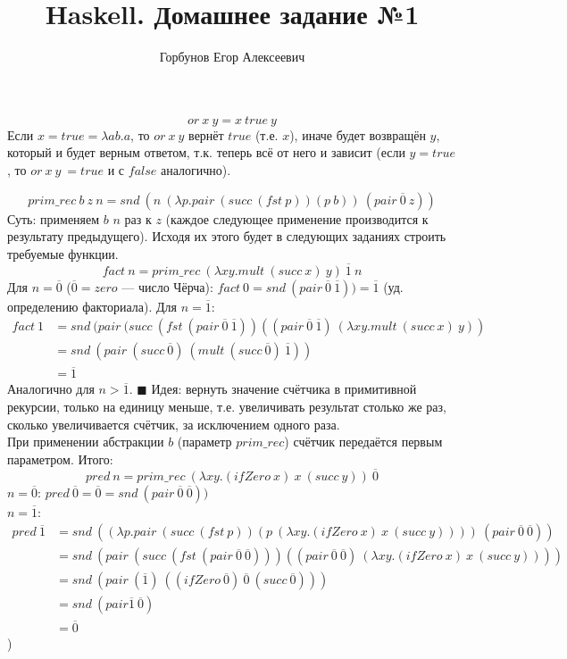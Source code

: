 

\title{Haskell. Домашнее задание №1}
\author{Горбунов Егор Алексеевич}


\maketitle

\[or\ x\ y = x\ true\ y\]
Если $x = true = \lambda ab.a$, то $or\ x\ y$ вернёт $true$ (т.е. $x$), иначе будет возвращён $y$, который и будет 
верным ответом, т.к. теперь всё от него и зависит (если $y = true$, то $or\ x\ y\ = true$ и с $false$ аналогично).

\[
prim\_rec\ b\ z\ n = snd\ (n\ (\lambda p.pair\ (succ\ (fst\ p))(p\ b))\ (pair\ \overline{0}\ z))
\]
Суть: применяем $b$ $n$ раз к $z$ (каждое следующее применение производится к результату предыдущего). Исходя их этого будет в следующих 
заданиях строить требуемые функции.
\[
fact\ n = prim\_rec\ (\lambda xy.mult\ (succ\ x)\ y)\ \overline{1}\ n
\]
Для $n = \overline{0}$ ($\overline{0}=zero$ --- число Чёрча): $fact\ 0 = snd\ (pair\ \overline{0}\ \overline{1})) = \overline{1}$ (уд. определению факториала).
Для $n = \overline{1}$: 
\begin{equation*}
\begin{split}
fact\ 1 &= snd\ (pair\ (succ\ (fst\ (pair\ \overline{0}\ \overline{1}))((pair\ \overline{0}\ \overline{1})\ (\lambda xy.mult\ (succ\ x)\ y)) \\
        &= snd\ (pair\ (succ\ \overline{0})\ (mult\ (succ\ \overline{0})\ \overline{1})) \\
        &= \overline{1}
\end{split}
\end{equation*}
Аналогично для $n > \overline{1}$. \hfill $\blacksquare$
Идея: вернуть значение счётчика в примитивной рекурсии, только на единицу меньше, т.е. увеличивать результат столько же раз, сколько увеличивается счётчик,
за исключением одного раза.\\
При применении абстракции $b$ (параметр $prim\_rec$) счётчик передаётся первым параметром. Итого:
\[
pred\ n = prim\_rec\ (\lambda xy.(ifZero\ x)\ x\ (succ\ y))\ \overline{0} 
\]
$n=\overline{0}$: $pred\ \overline{0} = \overline{0} = snd\ (pair\ \overline{0}\ \overline{0}))$\\
$n=\overline{1}$: 
\begin{equation*}
\begin{split}
pred\ \overline{1} &= snd\ ((\lambda p.pair\ (succ\ (fst\ p))(p\ (\lambda xy.(ifZero\ x)\ x\ (succ\ y))))\ (pair\ \overline{0}\ \overline{0}))\\
			       &= snd\ (pair\ (succ\ (fst\ (pair\ \overline{0}\ \overline{0})))((pair\ \overline{0}\ \overline{0})\ (\lambda xy.(ifZero\ x)\ x\ (succ\ y))))\\
			       &= snd\ (pair\ (\overline{1})\ ((ifZero\ \overline{0})\ \overline{0}\ (succ\ \overline{0}))) \\
			       &= snd\ (pair \overline{1}\ \overline{0}) \\
			       &= \overline{0}
\end{split}
\end{equation*}) 
